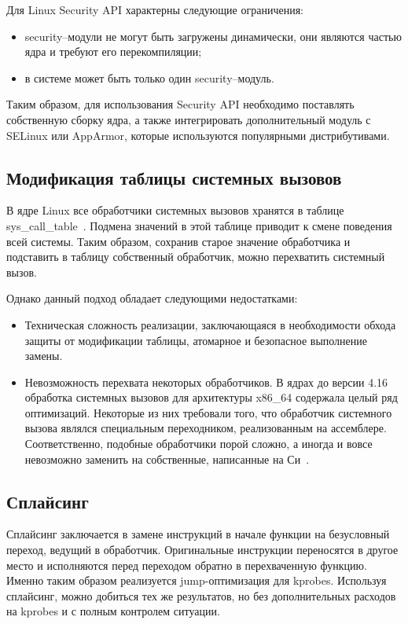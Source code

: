 Для Linux Security API характерны следующие ограничения:

\begin{itemize}
	\item[---] security–модули не могут быть загружены динамически, они являются частью ядра и требуют его перекомпиляции;
	\item[---] в системе может быть только один security–модуль.
\end{itemize}

Таким образом, для использования Security API необходимо поставлять собственную сборку ядра, а также интегрировать дополнительный модуль с SELinux или AppArmor, которые используются популярными дистрибутивами.

\subsection{Модификация таблицы системных вызовов}

В ядре Linux все обработчики системных вызовов хранятся в таблице sys\_call\_table~\cite{linux-kernel}. Подмена значений в этой таблице приводит к смене поведения всей системы. Таким образом, сохранив старое значение обработчика и подставить в таблицу собственный обработчик, можно перехватить системный вызов.

Однако данный подход обладает следующими недостатками:

\begin{itemize}
	\item[---] Техническая сложность реализации, заключающаяся в необходимости обхода защиты от модификации таблицы, атомарное и безопасное выполнение замены.
	\item[---] Невозможность перехвата некоторых обработчиков. В ядрах до версии 4.16 обработка системных вызовов для архитектуры x86\_64 содержала целый ряд оптимизаций. Некоторые из них требовали того, что обработчик системного вызова являлся специальным переходником, реализованным на ассемблере. Соответственно, подобные обработчики порой сложно, а иногда и вовсе невозможно заменить на собственные, написанные на Си~\cite{habr-hooking}.
\end{itemize}

\subsection{Сплайсинг}

Сплайсинг заключается в замене инструкций в начале функции на безусловный переход, ведущий в обработчик. Оригинальные инструкции переносятся в другое место и исполняются перед переходом обратно в перехваченную функцию. Именно таким образом реализуется jump-оптимизация для kprobes. Используя сплайсинг, можно добиться тех же результатов, но без дополнительных расходов на kprobes и с полным контролем ситуации.

